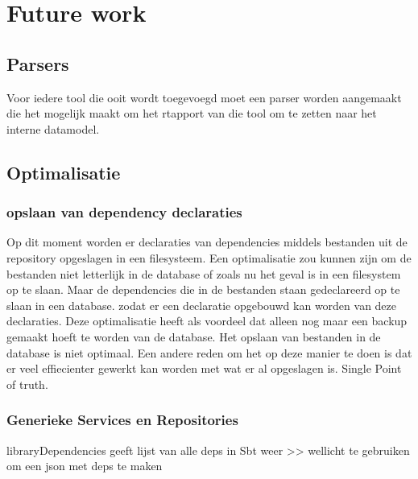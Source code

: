 
\chapter{Future work}\label{ch:name} %


\section{Parsers}\label{sec:parsers}
Voor iedere tool die ooit wordt toegevoegd moet een parser worden aangemaakt die het mogelijk maakt om het rtapport van die tool om te zetten naar het interne datamodel.




\section{Optimalisatie}

\subsection{opslaan van dependency declaraties}
Op dit moment worden er declaraties van dependencies middels bestanden uit de repository opgeslagen in een filesysteem. Een optimalisatie zou kunnen zijn om de bestanden niet letterlijk in de database of zoals nu het geval is in een filesystem op te slaan. Maar de dependencies die in de bestanden staan gedeclareerd op te slaan in een database. zodat er een declaratie opgebouwd kan worden van deze declaraties. Deze optimalisatie heeft als voordeel dat alleen nog maar een backup gemaakt hoeft te worden van de database. Het opslaan van bestanden in de database is niet optimaal. Een andere reden om het op deze manier te doen is dat er veel effiecienter gewerkt kan worden met wat er al opgeslagen is. Single Point of truth.



\subsection{Generieke Services en Repositories}

libraryDependencies geeft lijst van alle deps in Sbt weer >> wellicht te gebruiken om een json met deps te maken


